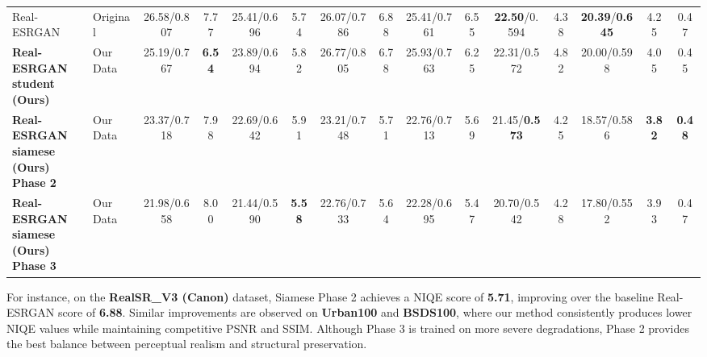 \documentclass[conference]{IEEEtran}
\begin{document}
\begin{table}[t]
{\begin{tabular}{llccccccccccccc}
Real-ESRGAN~\cite{wang2021realesrgan}
  & Original
  & 26.58/0.807                              & 7.77
  & 25.41/0.696                              & 5.74
  & 26.07/0.786                              & 6.88
  & 25.41/0.761                              & 6.55
  & \textbf{22.50}/0.594                     & 4.38
  & \textbf{20.39}/\textbf{0.645}            & 4.25
  & 0.47 \\

\makecell[l]{\textbf{Real-ESRGAN} \\ \textbf{student (Ours)}}
  & Our Data
  & 25.19/0.767                              & \textbf{6.54}
  & 23.89/0.694                              & 5.82
  & 26.77/0.805                              & 6.78
  & 25.93/0.763                              & 6.25
  & 22.31/0.572                              & 4.82
  & 20.00/0.598                              & 4.05
  & 0.45 \\

\makecell[l]{\textbf{Real-ESRGAN} \\ \textbf{siamese (Ours)} \\ \textbf{Phase 2}}
  & Our Data
  & 23.37/0.718                              & 7.98
  & 22.69/0.642                              & 5.91
  & 23.21/0.748                              & 5.71
  & 22.76/0.713                              & 5.69
  & 21.45/\textbf{0.573}                     & 4.25
  & 18.57/0.586                              & \textbf{3.82}
  & \textbf{0.48} \\

\makecell[l]{\textbf{Real-ESRGAN} \\ \textbf{siamese (Ours)} \\ \textbf{Phase 3}}
  & Our Data
  & 21.98/0.658                              & 8.00
  & 21.44/0.590                              & \textbf{5.58}
  & 22.76/0.733                              & 5.64
  & 22.28/0.695                              & 5.47
  & 20.70/0.542                              & 4.28
  & 17.80/0.552                              & 3.93
  & 0.47 \\
\bottomrule
\end{tabular}%
}
\end{table}


For instance, on the \textbf{RealSR\_V3 (Canon)} dataset, Siamese Phase 2 achieves a NIQE score of \textbf{5.71}, improving over the baseline Real-ESRGAN score of \textbf{6.88}. Similar improvements are observed on \textbf{Urban100} and \textbf{BSDS100}, where our method consistently produces lower NIQE values while maintaining competitive PSNR and SSIM. Although Phase 3 is trained on more severe degradations, Phase 2 provides the best balance between perceptual realism and structural preservation.
\end{document}
